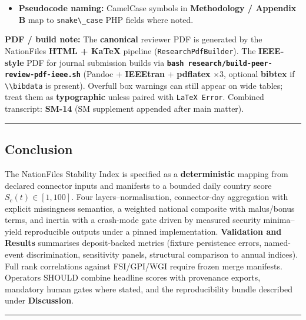 \documentclass[
  11pt,
  peerreview,journal,onecolumn]{IEEEtran}
\newcommand{\passthrough}[1]{#1}
\providecommand{\tightlist}{%
  \setlength{\itemsep}{0pt}\setlength{\parskip}{0pt}}
\begin{document}
\begin{itemize}
\tightlist
\item
  \textbf{Pseudocode naming:} CamelCase symbols in \textbf{Methodology /
  Appendix B} map to \passthrough{\lstinline!snake\_case!} PHP fields
  where noted.
\end{itemize}

\textbf{PDF / build note:} The \textbf{canonical} reviewer PDF is
generated by the NationFiles \textbf{HTML + KaTeX} pipeline
(\passthrough{\lstinline!ResearchPdfBuilder!}). The \textbf{IEEE-style}
PDF for journal submission builds via
\textbf{\passthrough{\lstinline!bash research/build-peer-review-pdf-ieee.sh!}}
(Pandoc + \textbf{IEEEtran} + \textbf{pdflatex} ×3, optional
\textbf{bibtex} if \passthrough{\lstinline!\\bibdata!} is present).
Overfull box warnings can still appear on wide tables; treat them as
\textbf{typographic} unless paired with
\passthrough{\lstinline!LaTeX Error!}. Combined transcript:
\textbf{SM-14} (SM supplement appended after main matter).

\begin{center}\rule{0.5\linewidth}{0.5pt}\end{center}

\hypertarget{conclusion}{%
\subsection{Conclusion}\label{conclusion}}

The NationFiles Stability Index is specified as a \textbf{deterministic}
mapping from declared connector inputs and manifests to a bounded daily
country score \(S_c(t)\in[1,100]\). Four layers--normalisation,
connector-day aggregation with explicit missingness semantics, a
weighted national composite with malus/bonus terms, and inertia with a
crash-mode gate driven by measured security minima--yield reproducible
outputs under a pinned implementation. \textbf{Validation and Results}
summarises deposit-backed metrics (fixture persistence errors,
named-event discrimination, sensitivity panels, structural comparison to
annual indices). Full rank correlations against FSI/GPI/WGI require
frozen merge manifests. Operators SHOULD combine headline scores with
provenance exports, mandatory human gates where stated, and the
reproducibility bundle described under \textbf{Discussion}.

\begin{center}\rule{0.5\linewidth}{0.5pt}\end{center}
\end{document}
